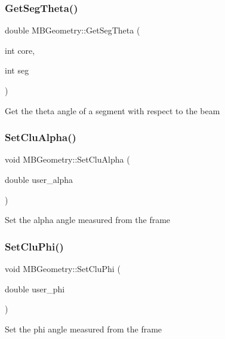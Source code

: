 \subsubsection{\texorpdfstring{Get\+Seg\+Theta()}{GetSegTheta()}}
{\footnotesize\ttfamily double M\+B\+Geometry\+::\+Get\+Seg\+Theta (\begin{DoxyParamCaption}\item[{int}]{core,  }\item[{int}]{seg }\end{DoxyParamCaption})}

Get the theta angle of a segment with respect to the beam \mbox{\label{class_m_b_geometry_a0d4868b0360a6e5534918a9813540015}} 
\subsubsection{\texorpdfstring{Set\+Clu\+Alpha()}{SetCluAlpha()}}
{\footnotesize\ttfamily void M\+B\+Geometry\+::\+Set\+Clu\+Alpha (\begin{DoxyParamCaption}\item[{double}]{user\+\_\+alpha }\end{DoxyParamCaption})}

Set the alpha angle measured from the frame \mbox{\label{class_m_b_geometry_a74142f84cf6317d52ae39c0e0ff8a87e}} 
\subsubsection{\texorpdfstring{Set\+Clu\+Phi()}{SetCluPhi()}}
{\footnotesize\ttfamily void M\+B\+Geometry\+::\+Set\+Clu\+Phi (\begin{DoxyParamCaption}\item[{double}]{user\+\_\+phi }\end{DoxyParamCaption})}

Set the phi angle measured from the frame \mbox{\label{class_m_b_geometry_a292c4326421c78871667e91c3694ae35}} 
